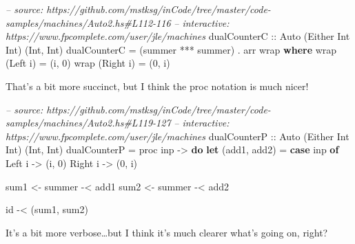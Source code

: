 \documentclass[]{article}
\newenvironment{Shaded}{}{}
\newcommand{\KeywordTok}[1]{\textcolor[rgb]{0.00,0.44,0.13}{\textbf{{#1}}}}
\newcommand{\DataTypeTok}[1]{\textcolor[rgb]{0.56,0.13,0.00}{{#1}}}
\newcommand{\DecValTok}[1]{\textcolor[rgb]{0.25,0.63,0.44}{{#1}}}
\newcommand{\CommentTok}[1]{\textcolor[rgb]{0.38,0.63,0.69}{\textit{{#1}}}}
\newcommand{\OtherTok}[1]{\textcolor[rgb]{0.00,0.44,0.13}{{#1}}}
\newcommand{\FunctionTok}[1]{\textcolor[rgb]{0.02,0.16,0.49}{{#1}}}
\newcommand{\NormalTok}[1]{{#1}}
\begin{document}
\begin{Shaded}
\begin{Highlighting}[]
\CommentTok{-- source: https://github.com/mstksg/inCode/tree/master/code-samples/machines/Auto2.hs#L112-116}
\CommentTok{-- interactive: https://www.fpcomplete.com/user/jle/machines}
\OtherTok{dualCounterC ::} \DataTypeTok{Auto} \NormalTok{(}\DataTypeTok{Either} \DataTypeTok{Int} \DataTypeTok{Int}\NormalTok{) (}\DataTypeTok{Int}\NormalTok{, }\DataTypeTok{Int}\NormalTok{)}
\NormalTok{dualCounterC }\FunctionTok{=} \NormalTok{(summer }\FunctionTok{***} \NormalTok{summer) }\FunctionTok{.} \NormalTok{arr wrap}
  \KeywordTok{where}
    \NormalTok{wrap (}\DataTypeTok{Left} \NormalTok{i)  }\FunctionTok{=} \NormalTok{(i, }\DecValTok{0}\NormalTok{)}
    \NormalTok{wrap (}\DataTypeTok{Right} \NormalTok{i) }\FunctionTok{=} \NormalTok{(}\DecValTok{0}\NormalTok{, i)}
\end{Highlighting}
\end{Shaded}

That's a bit more succinct, but I think the proc notation is much nicer!

\begin{Shaded}
\begin{Highlighting}[]
\CommentTok{-- source: https://github.com/mstksg/inCode/tree/master/code-samples/machines/Auto2.hs#L119-127}
\CommentTok{-- interactive: https://www.fpcomplete.com/user/jle/machines}
\OtherTok{dualCounterP ::} \DataTypeTok{Auto} \NormalTok{(}\DataTypeTok{Either} \DataTypeTok{Int} \DataTypeTok{Int}\NormalTok{) (}\DataTypeTok{Int}\NormalTok{, }\DataTypeTok{Int}\NormalTok{)}
\NormalTok{dualCounterP }\FunctionTok{=} \NormalTok{proc inp }\OtherTok{->} \KeywordTok{do}
    \KeywordTok{let} \NormalTok{(add1, add2) }\FunctionTok{=} \KeywordTok{case} \NormalTok{inp }\KeywordTok{of} \DataTypeTok{Left} \NormalTok{i  }\OtherTok{->} \NormalTok{(i, }\DecValTok{0}\NormalTok{)}
                                   \DataTypeTok{Right} \NormalTok{i }\OtherTok{->} \NormalTok{(}\DecValTok{0}\NormalTok{, i)}

    \NormalTok{sum1 }\OtherTok{<-} \NormalTok{summer }\FunctionTok{-<} \NormalTok{add1}
    \NormalTok{sum2 }\OtherTok{<-} \NormalTok{summer }\FunctionTok{-<} \NormalTok{add2}

    \NormalTok{id }\FunctionTok{-<} \NormalTok{(sum1, sum2)}
\end{Highlighting}
\end{Shaded}

It's a bit more verbose\ldots{}but I think it's much clearer what's
going on, right?
\end{document}
